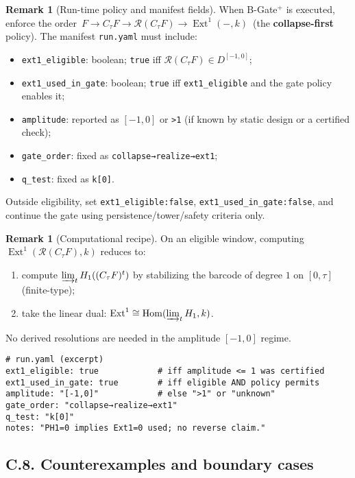 \documentclass[11pt]{article}
\numberwithin{equation}{section}
\theoremstyle{plain}
\theoremstyle{definition}
\theoremstyle{remark}
\DeclareMathOperator{\Ext}{Ext}
\DeclareMathOperator{\Hom}{Hom}
\theoremstyle{plain}
\theoremstyle{definition}
\numberwithin{equation}{section}
\theoremstyle{definition}
\newtheorem{remark}[theorem]{Remark}
\numberwithin{equation}{section}
\theoremstyle{plain}
\theoremstyle{definition}
\theoremstyle{remark}
\begin{document}
\begin{remark}[Run-time policy and manifest fields]\label{C:rk:runtime}
When B-Gate\(^{+}\) is executed, enforce the order
\(\,F\to C_\tau F\to \mathcal{R}(C_\tau F)\to \Ext^1(-,k)\,\) (the \textbf{collapse-first} policy).
The manifest \texttt{run.yaml} must include:
\begin{itemize}
  \item \texttt{ext1\_eligible}: boolean; \texttt{true} iff \(\mathcal{R}(C_\tau F)\in D^{[-1,0]}\);
  \item \texttt{ext1\_used\_in\_gate}: boolean; \texttt{true} iff \texttt{ext1\_eligible} and the gate policy enables it;
  \item \texttt{amplitude}: reported as \([-1,0]\) or \texttt{>1} (if known by static design or a certified check);
  \item \texttt{gate\_order}: fixed as \texttt{collapse→realize→ext1};
  \item \texttt{q\_test}: fixed as \texttt{k[0]}.
\end{itemize}
Outside eligibility, set \texttt{ext1\_eligible:false}, \texttt{ext1\_used\_in\_gate:false}, and continue the gate using persistence/tower/safety criteria only.
\end{remark}

\begin{remark}[Computational recipe]\label{C:rk:recipe}
On an eligible window, computing \(\Ext^1(\mathcal{R}(C_\tau F),k)\) reduces to:
\begin{enumerate}\itemsep0.2em
  \item compute \(\varinjlim_t H_1((C_\tau F)^t)\) by stabilizing the barcode of degree \(1\) on \([0,\tau]\) (finite-type);
  \item take the linear dual: \(\Ext^1 \cong \Hom(\varinjlim_t H_1,k)\).
\end{enumerate}
No derived resolutions are needed in the amplitude \([-1,0]\) regime.
\end{remark}

\begin{verbatim}
# run.yaml (excerpt)
ext1_eligible: true            # iff amplitude <= 1 was certified
ext1_used_in_gate: true        # iff eligible AND policy permits
amplitude: "[-1,0]"            # else ">1" or "unknown"
gate_order: "collapse→realize→ext1"
q_test: "k[0]"
notes: "PH1=0 implies Ext1=0 used; no reverse claim."
\end{verbatim}

\subsection*{C.8. Counterexamples and boundary cases}\label{C:ssec:counterexamples}
\end{document}
